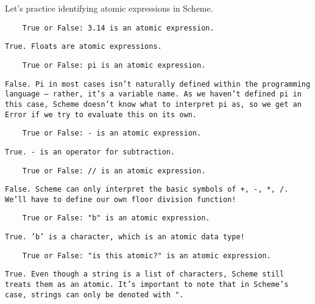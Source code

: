 \begin{blocksection}
Let's practice identifying atomic expressions in Scheme.

\begin{lstlisting}
    True or False: 3.14 is an atomic expression.
\end{lstlisting}
\begin{solution}[0.25in]
\texttt{True. Floats are atomic expressions.}
\end{solution}

\begin{lstlisting}
    True or False: pi is an atomic expression.
\end{lstlisting}
\begin{solution}[0.25in]
    \texttt{False. Pi in most cases isn't naturally defined within the programming language -- rather, it's a variable name. As we haven't defined pi in this case, Scheme doesn't know what to interpret pi as, so we get an Error if we try to evaluate this on its own.}
\end{solution}

\begin{lstlisting}
    True or False: - is an atomic expression.
\end{lstlisting}
\begin{solution}[0.25in]
    \texttt{True. - is an operator for subtraction.}
\end{solution}

\begin{lstlisting}
    True or False: // is an atomic expression.
\end{lstlisting}
\begin{solution}[0.25in]
    \texttt{False. Scheme can only interpret the basic symbols of +, -, *, /. We'll have to define our own floor division function!}
\end{solution}

\begin{lstlisting}
    True or False: "b" is an atomic expression.
\end{lstlisting}
\begin{solution}[0.25in]
    \texttt{True. 'b' is a character, which is an atomic data type!}
\end{solution}

\begin{lstlisting}
    True or False: "is this atomic?" is an atomic expression.
\end{lstlisting}
\begin{solution}[0.25in]
    \texttt{True. Even though a string is a list of characters, Scheme still treats them as an atomic. It's important to note that in Scheme's case, strings can only be denoted with ".}
\end{solution}
\end{blocksection}